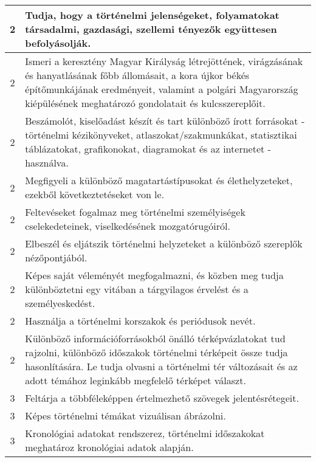 \begin{longtable}{c | p{12cm} }
                                
                                          2 &  Tudja, hogy a történelmi jelenségeket, folyamatokat társadalmi, gazdasági, szellemi tényezők együttesen befolyásolják. \\ \hline
                                          2 &  Ismeri a keresztény Magyar Királyság létrejöttének, virágzásának és hanyatlásának főbb állomásait, a kora újkor békés építőmunkájának eredményeit, valamint a polgári Magyarország kiépülésének meghatározó gondolatait és kulcsszereplőit. \\ \hline
                                          2 &  Beszámolót, kiselőadást készít és tart különböző írott forrásokat - történelmi kézikönyveket, atlaszokat/szakmunkákat, statisztikai táblázatokat, grafikonokat, diagramokat és az internetet - használva. \\ \hline
                                          2 &  Megfigyeli a különböző magatartástípusokat és élethelyzeteket, ezekből következtetéseket von le. \\ \hline
                                          2 &  Feltevéseket fogalmaz meg történelmi személyiségek cselekedeteinek, viselkedésének mozgatórugóiról. \\ \hline
                                          2 &  Elbeszél és eljátszik történelmi helyzeteket a különböző szereplők nézőpontjából. \\ \hline
                                          2 &  Képes saját véleményét megfogalmazni, és közben meg tudja különböztetni egy vitában a tárgyilagos érvelést és a személyeskedést. \\ \hline
                                          2 &  Használja a történelmi korszakok és periódusok nevét. \\ \hline
                                          2 &  Különböző információforrásokból önálló térképvázlatokat tud rajzolni, különböző időszakok történelmi térképeit össze tudja hasonlítására. Le tudja olvasni a történelmi tér változásait és az adott témához leginkább megfelelő térképet választ. \\ \hline
                                      
                                
                                          3 &  Feltárja a többféleképpen értelmezhető szövegek jelentésrétegeit. \\ \hline
                                          3 &  Képes történelmi témákat vizuálisan ábrázolni. \\ \hline
                                          3 &  Kronológiai adatokat rendszerez, történelmi időszakokat meghatároz kronológiai adatok alapján. \\ \hline
                                      

\end{longtable}

